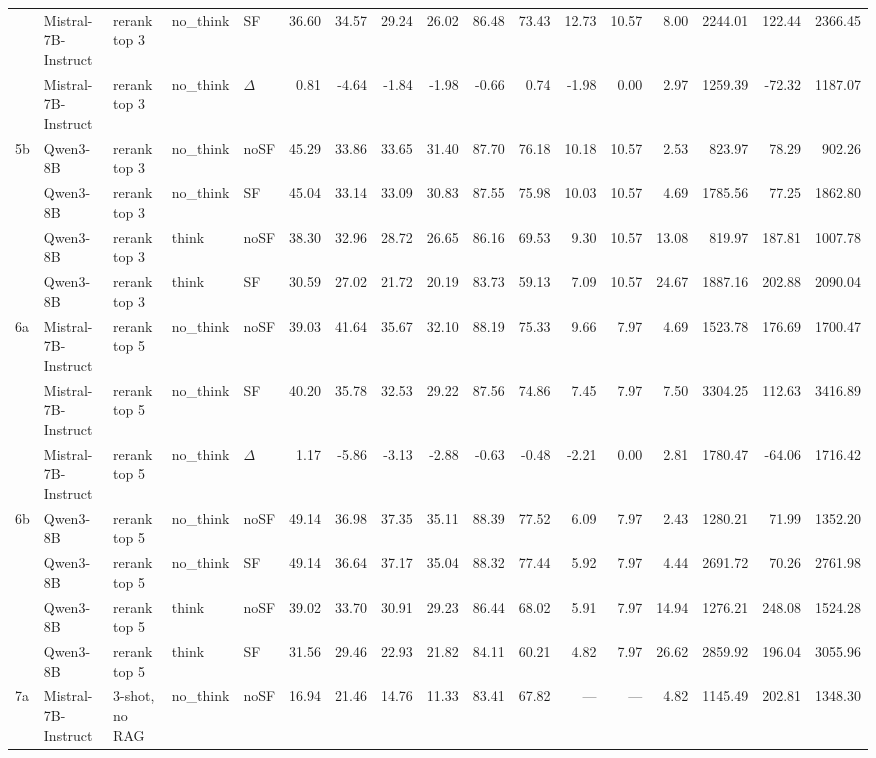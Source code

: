 \begin{landscape}
\begin{footnotesize}
\begin{longtable}{l l l l l r r r r r r r r r r r r}
 & Mistral-7B-Instruct & rerank top 3 & no\_think & SF & 36.60 & 34.57 & 29.24 & 26.02 & 86.48 & 73.43 & 12.73 & 10.57 & 8.00 & 2244.01 & 122.44 & 2366.45 \\
 & Mistral-7B-Instruct & rerank top 3 & no\_think & $\Delta$ & 0.81 & -4.64 & -1.84 & -1.98 & -0.66 & 0.74 & -1.98 & 0.00 & 2.97 & 1259.39 & -72.32 & 1187.07 \\
5b & Qwen3-8B & rerank top 3 & no\_think & noSF & 45.29 & 33.86 & 33.65 & 31.40 & 87.70 & 76.18 & 10.18 & 10.57 & 2.53 & 823.97 & 78.29 & 902.26 \\
 & Qwen3-8B & rerank top 3 & no\_think & SF & 45.04 & 33.14 & 33.09 & 30.83 & 87.55 & 75.98 & 10.03 & 10.57 & 4.69 & 1785.56 & 77.25 & 1862.80 \\
 & Qwen3-8B & rerank top 3 & think & noSF & 38.30 & 32.96 & 28.72 & 26.65 & 86.16 & 69.53 & 9.30 & 10.57 & 13.08 & 819.97 & 187.81 & 1007.78 \\
 & Qwen3-8B & rerank top 3 & think & SF & 30.59 & 27.02 & 21.72 & 20.19 & 83.73 & 59.13 & 7.09 & 10.57 & 24.67 & 1887.16 & 202.88 & 2090.04 \\
\midrule
6a & Mistral-7B-Instruct & rerank top 5 & no\_think & noSF & 39.03 & 41.64 & 35.67 & 32.10 & 88.19 & 75.33 & 9.66 & 7.97 & 4.69 & 1523.78 & 176.69 & 1700.47 \\
 & Mistral-7B-Instruct & rerank top 5 & no\_think & SF & 40.20 & 35.78 & 32.53 & 29.22 & 87.56 & 74.86 & 7.45 & 7.97 & 7.50 & 3304.25 & 112.63 & 3416.89 \\
 & Mistral-7B-Instruct & rerank top 5 & no\_think & $\Delta$ & 1.17 & -5.86 & -3.13 & -2.88 & -0.63 & -0.48 & -2.21 & 0.00 & 2.81 & 1780.47 & -64.06 & 1716.42 \\
6b & Qwen3-8B & rerank top 5 & no\_think & noSF & 49.14 & 36.98 & 37.35 & 35.11 & 88.39 & 77.52 & 6.09 & 7.97 & 2.43 & 1280.21 & 71.99 & 1352.20 \\
 & Qwen3-8B & rerank top 5 & no\_think & SF & 49.14 & 36.64 & 37.17 & 35.04 & 88.32 & 77.44 & 5.92 & 7.97 & 4.44 & 2691.72 & 70.26 & 2761.98 \\
 & Qwen3-8B & rerank top 5 & think & noSF & 39.02 & 33.70 & 30.91 & 29.23 & 86.44 & 68.02 & 5.91 & 7.97 & 14.94 & 1276.21 & 248.08 & 1524.28 \\
 & Qwen3-8B & rerank top 5 & think & SF & 31.56 & 29.46 & 22.93 & 21.82 & 84.11 & 60.21 & 4.82 & 7.97 & 26.62 & 2859.92 & 196.04 & 3055.96 \\
\midrule
7a & Mistral-7B-Instruct & 3-shot, no RAG & no\_think & noSF & 16.94 & 21.46 & 14.76 & 11.33 & 83.41 & 67.82 & --- & --- & 4.82 & 1145.49 & 202.81 & 1348.30 \\

\end{longtable}
\end{footnotesize}
\end{landscape}
